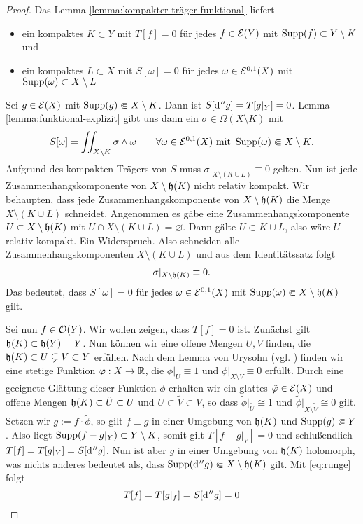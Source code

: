 \begin{proof}
  Das Lemma \ref{lemma:kompakter-träger-funktional} liefert
  \begin{itemize}
  \item ein kompaktes $K \subset Y$ mit $T[f] = 0$ für jedes $f \in
    \mathcal{E}(Y)$ mit $\operatorname{Supp}(f) \subset Y \setminus K$ und
  \item ein kompaktes $L \subset X$ mit $S[\omega] = 0$ für jedes
    $\omega \in \mathcal{E}^{0,1}(X)$ mit $\operatorname{Supp}(\omega) \subset X\setminus L$
  \end{itemize}
   Sei $g \in \mathcal{E}(X)$ mit $\operatorname{Supp}(g) \Subset X \setminus K$. Dann ist
   $S[\d[''g]] = T[g|_Y]  = 0$. Lemma \ref{lemma:funktional-explizit}
   gibt uns dann ein $\sigma \in \Omega(X\setminus K)$ mit
   \[
   S[\omega] = \iint_{X \setminus K}\sigma \wedge \omega \qquad
   \forall \omega \in \mathcal{E}^{0,1}(X) \text{ mit } \operatorname{Supp}(\omega)
   \Subset X\setminus K.
   \]
   Aufgrund des kompakten Trägers von $S$ muss $\sigma|_{X \setminus
     (K \cup L)} \equiv 0$ gelten. 
   Nun ist jede Zusammenhangskomponente von $X \setminus \mathfrak{h}(K)$
   nicht relativ kompakt. 
   Wir behaupten, dass jede Zusammenhangskomponente von $X \setminus
   \mathfrak{h}(K)$ die Menge $X \setminus (K \cup L)$ schneidet.
   Angenommen es gäbe eine Zusammenhangskomponente $U \subset X
   \setminus \mathfrak{h}(K)$ mit $U \cap X \setminus ( K \cup L) =
   \varnothing$. Dann gälte $U \subset K \cup L$, also wäre $U$ relativ
   kompakt. Ein Widerspruch. Also schneiden alle
   Zusammenhangskomponenten $X \setminus (K \cup L)$ und aus dem
   Identitätssatz folgt
   \begin{align}
   \sigma|_{X \setminus \mathfrak{h}(K)} \equiv 0. \label{eq:runge}
   \end{align}
   Das bedeutet, dass $S[\omega] = 0$ für jedes $\omega \in
   \mathcal{E}^{0,1}(X)$ mit $\operatorname{Supp}(\omega) \Subset X \setminus
   \mathfrak{h}(K)$ gilt.

   Sei nun $f \in \mathcal{O}(Y)$. Wir wollen zeigen, dass $T[f] = 0$ ist. 
   Zunächst gilt $\mathfrak{h}(K) \subset \mathfrak{h}(Y) = Y$. Nun können wir
   eine offene Mengen $U, V$ finden, die $ \mathfrak{h}(K) \subset U
   \subsetneq V \subset Y$ erfüllen. Nach dem Lemma von Urysohn
   (vgl. \cite[Satz 12.2]{Jam}) finden
   wir eine stetige Funktion $\varphi: X \rightarrow \mathbb{R}$, die $\phi|_U \equiv 1$
   und $\phi|_{X \setminus \bar V} \equiv 0$ erfüllt. Durch eine geeignete Glättung
   dieser Funktion $\phi$ erhalten wir ein glattes $\tilde {\varphi} \in
   \mathcal{E}(X)$ und offene Mengen $\mathfrak{h}(K) \subset \tilde U \subset U$
   und $U \subset \tilde V \subset V$, so dass $\tilde \phi|_{\tilde
     U} \cong 1$ und $\tilde \phi|_{X \setminus \tilde {\bar V}} \cong
   0$ gilt. Setzen wir $ g := f \cdot \tilde \phi$, so gilt
   $f \equiv g$ in einer Umgebung von $\mathfrak{h}(K)$ und $\operatorname{Supp}(g) \Subset Y$.
   Also liegt $\operatorname{Supp}(f - g|_Y) \subset Y \setminus K$, somit gilt $T[f- g|_Y] = 0$
   und schlußendlich $T[f] = T[g|_Y] = S[\d[''g]]$. 
   Nun ist aber $g$ in einer Umgebung von $\mathfrak{h}(K)$ holomorph, was
   nichts anderes bedeutet als, dass $\Supp(\d[''g]) \Subset X \setminus
   \runge(K)$ gilt.
   Mit \eqref{eq:runge} folgt
   \[
   T[f] = T[g|_f] = S[\d[''g]] = 0
   \]
\end{proof}

